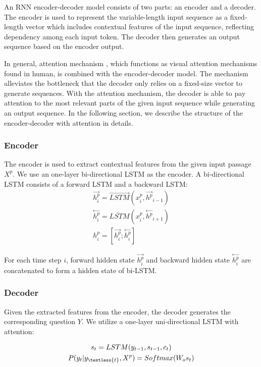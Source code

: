 \documentclass[letterpaper]{article} %
\begin{document}
An RNN encoder-decoder model consists of two parts: an encoder and a decoder. The encoder is used to represent the variable-length input sequence as a fixed-length vector which includes contextual features of the input sequence, reflecting dependency among each input token. The decoder then generates an output sequence based on the encoder output.

In general, attention mechanism \cite{bahdanau2014neural}, which functions as visual attention mechanisms found in human, is combined with the encoder-decoder model. The mechanism alleviates the bottleneck that the decoder only relies on a fixed-size vector to generate sequences. With the attention mechanism, the decoder is able to pay attention to the most relevant parts of the given input sequence while generating an output sequence. In the following section, we describe the structure of the encoder-decoder with attention in details.

\subsubsection{Encoder}
The encoder is used to extract contextual features from the given input passage \(X^p\). We use an one-layer bi-directional LSTM as the encoder. A bi-directional LSTM consists of a forward LSTM and a backward LSTM:
\begin{gather}
\overset{\rightarrow}{h^p_i} = \overrightarrow{LSTM}(x^p_i, \overset{\rightarrow}{h^p}_{i-1})  \label{eq_3} \\
\overset{\leftarrow}{h^p_i} = \overleftarrow{LSTM}(x^p_i, \overset{\leftarrow}{h^p}_{i+1})  \label{eq_4} \\
h^p_i = [\overset{\rightarrow}{h^p_i};\overset{\leftarrow}{h^p_i}] \label{eq_5}
\end{gather}

For each time step \(i\), forward hidden state \(\overset{\rightarrow}{h^p_i}\) and backward hidden state \(\overset{\leftarrow}{h^p_i}\) are concatenated to form a hidden state of bi-LSTM.

\subsubsection{Decoder}
Given the extracted features from the encoder, the decoder generates the corresponding question \(Y\). We utilize a one-layer uni-directional LSTM with attention:

\begin{gather}
s_t = LSTM(y_{t-1}, s_{t-1}, c_t) \label{eq_6} \\
P(y_t |y_{\textless{t}}, X^p) = Softmax(W_os_t) \label{eq_7}
\end{gather}
\end{document}
